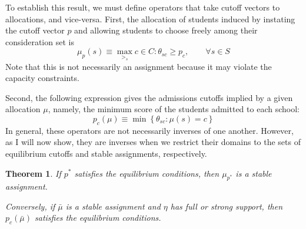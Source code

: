 \documentclass[12pt]{article}
\newtheorem{theorem}{Theorem}
\theoremstyle{definition}
\begin{document}
To establish this result, we must define operators that take cutoff vectors to allocations, and vice-versa. First, the allocation of students induced by instating the cutoff vector $p$ and allowing students to choose freely among their consideration set is
\[\mu_p(s) \equiv \max_{>_s} c \in C : \theta_{sc} \geq p_c, \qquad \forall s \in S\]  %
Note that this is not necessarily an assignment because it may violate the capacity constraints. 

Second, the following expression gives the admissions cutoffs implied by a given allocation $\mu$, namely, the minimum score of the students admitted to each school:
\[p_c(\mu) \equiv \min \left\{\theta_{sc}: \mu(s) = c\right\}\]
In general, these operators are not necessarily inverses of one another. However, as I will now show, they are inverses when we restrict their domains to the sets of equilibrium cutoffs and stable assignments, respectively. 

\begin{theorem}If $p^*$ satisfies the equilibrium conditions, then $\mu_{p^*}$ is a stable assignment. 

Conversely, if $\bar \mu$ is a stable assignment and $\eta$ has full or strong support, then $p_c(\bar \mu)$ satisfies the equilibrium conditions. \end{theorem}
\end{document}
